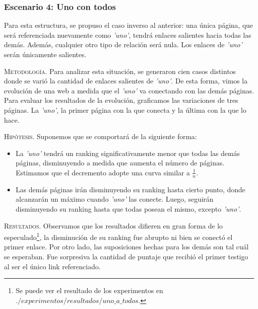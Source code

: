 \vspace{2em}
\subsubsection{Escenario 4: Uno con todos} Para esta estructura, se propuso el caso inverso al anterior: una única página, que será referenciada nuevamente como \textit{'uno'}, tendrá enlaces salientes hacia todas las demás. Además, cualquier otro tipo de relación será nula. Los enlaces de \textit{'uno'} serán únicamente salientes.

\vspace{2em}

\vspace{1em}
\noindent \textsc{Metodología}. Para analizar esta situación, se generaron cien casos distintos donde se varió la cantidad de enlaces salientes de \textit{'uno'}. De esta forma, vimos la evolución de una web a medida que el \textit{'uno'} va conectando con las demás páginas. Para evaluar los resultados de la evolución, graficamos las variaciones de tres páginas. La \textit{'uno'}, la primer página con la que conecta y la última con la que lo hace.

\vspace{1em}
\noindent \textsc{Hipótesis}. Suponemos que se comportará de la siguiente forma:
\begin{itemize}
\item La \textit{'uno'} tendrá un ranking significativamente menor que todas las demás páginas, disminuyendo a medida que aumenta el número de páginas. Estimamos que el decremento adopte una curva similar a $\frac{1}{n}$.
\item Las demás páginas irán disminuyendo su ranking hasta cierto punto, donde alcanzarán un máximo cuando \textit{'uno'} las conecte. Luego, seguirán disminuyendo su ranking hasta que todas posean el mismo, excepto \textit{'uno'}.
\end{itemize}

\vspace{1em}

\vspace{1em}
\noindent \textsc{Resultados}. Observamos que los resultados difieren en gran forma de lo especulado\footnote{Se puede ver el resultado de los experimentos en $./experimentos/resultados/uno\_a\_todos$.}, la disminución de su ranking fue abrupto ni bien se conectó el primer enlace. Por otro lado, las suposiciones hechas para los demás son tal cuál se esperaban. Fue sorpresiva la cantidad de puntaje que recibió el primer testigo al ser el único link referenciado.




